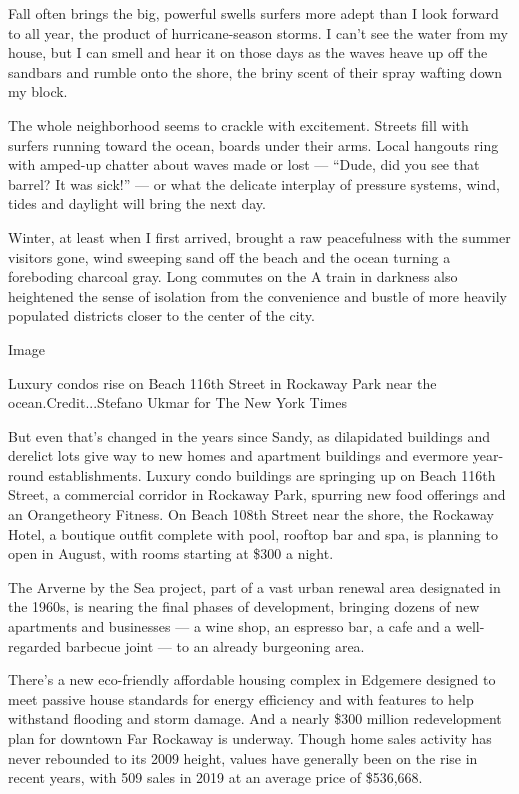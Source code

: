 Fall often brings the big, powerful swells surfers more adept than I
look forward to all year, the product of hurricane-season storms. I
can't see the water from my house, but I can smell and hear it on those
days as the waves heave up off the sandbars and rumble onto the shore,
the briny scent of their spray wafting down my block.

The whole neighborhood seems to crackle with excitement. Streets fill
with surfers running toward the ocean, boards under their arms. Local
hangouts ring with amped-up chatter about waves made or lost --- ``Dude,
did you see that barrel? It was sick!'' --- or what the delicate
interplay of pressure systems, wind, tides and daylight will bring the
next day.

Winter, at least when I first arrived, brought a raw peacefulness with
the summer visitors gone, wind sweeping sand off the beach and the ocean
turning a foreboding charcoal gray. Long commutes on the A train in
darkness also heightened the sense of isolation from the convenience and
bustle of more heavily populated districts closer to the center of the
city.

Image

Luxury condos rise on Beach 116th Street in Rockaway Park near the
ocean.Credit...Stefano Ukmar for The New York Times

But even that's changed in the years since Sandy, as dilapidated
buildings and derelict lots give way to new homes and apartment
buildings and evermore year-round establishments. Luxury condo buildings
are springing up on Beach 116th Street, a commercial corridor in
Rockaway Park, spurring new food offerings and an Orangetheory Fitness.
On Beach 108th Street near the shore, the Rockaway Hotel, a boutique
outfit complete with pool, rooftop bar and spa, is planning to open in
August, with rooms starting at \$300 a night.

The Arverne by the Sea project, part of a vast urban renewal area
designated in the 1960s, is nearing the final phases of development,
bringing dozens of new apartments and businesses --- a wine shop, an
espresso bar, a cafe and a well-regarded barbecue joint --- to an
already burgeoning area.

There's a new eco-friendly affordable housing complex in Edgemere
designed to meet passive house standards for energy efficiency and with
features to help withstand flooding and storm damage. And a nearly \$300
million redevelopment plan for downtown Far Rockaway is underway. Though
home sales activity has never rebounded to its 2009 height, values have
generally been on the rise in recent years, with 509 sales in 2019 at an
average price of \$536,668.

